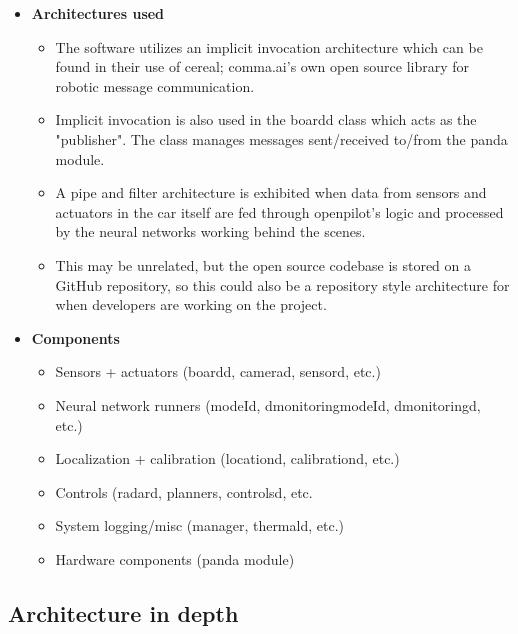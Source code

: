\documentclass[12pt]{article}
\begin{document}
\begin{itemize}

    \item \textbf{Architectures used}
    \begin{itemize}
        \item The software utilizes an implicit invocation architecture which can be found in their use of cereal; comma.ai's own open source library for robotic message communication. %
        \item Implicit invocation is also used in the boardd class which acts as the "publisher". The class manages messages sent/received to/from the panda module.
         \item A pipe and filter architecture is exhibited when data from sensors and actuators in the car itself are fed through openpilot's logic and processed by the neural networks working behind the scenes. %
        \item This may be unrelated, but the open source codebase is stored on a GitHub repository, so this could also be a repository style architecture for when developers are working on the project.
    \end{itemize}

    \item \textbf{Components}
    \begin{itemize}
        \item Sensors + actuators (boardd, camerad, sensord, etc.)
        \item Neural network runners (modeId, dmonitoringmodeId, dmonitoringd, etc.)
        \item Localization + calibration (locationd, calibrationd, etc.)
        \item Controls (radard, planners, controlsd, etc.
        \item System logging/misc (manager, thermald, etc.)
        \item Hardware components (panda module)
    \end{itemize}
\end{itemize}

\subsection{Architecture in depth}
\end{document}
